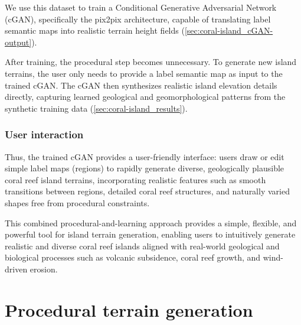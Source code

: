\documentclass{egpubl}
\begin{document}
We use this dataset to train a Conditional Generative Adversarial Network (cGAN), specifically the pix2pix architecture, capable of translating label semantic maps into realistic terrain height fields (\cref{sec:coral-island_cGAN-output}).

After training, the procedural step becomes unnecessary. To generate new island terrains, the user only needs to provide a label semantic map as input to the trained cGAN. The cGAN then synthesizes realistic island elevation details directly, capturing learned geological and geomorphological patterns from the synthetic training data (\cref{sec:coral-island_results}).

\subsubsection*{User interaction}
\label{sec:coral-island_cGAN-phase-interaction}

Thus, the trained cGAN provides a user-friendly interface: users draw or edit simple label maps (regions) to rapidly generate diverse, geologically plausible coral reef island terrains, incorporating realistic features such as smooth transitions between regions, detailed coral reef structures, and naturally varied shapes free from procedural constraints.

\midConclusion

This combined procedural-and-learning approach provides a simple, flexible, and powerful tool for island terrain generation, enabling users to intuitively generate realistic and diverse coral reef islands aligned with real-world geological and biological processes such as volcanic subsidence, coral reef growth, and wind-driven erosion.
















\section{Procedural terrain generation}
\label{sec:coral-island_example-generation}

\end{document}
